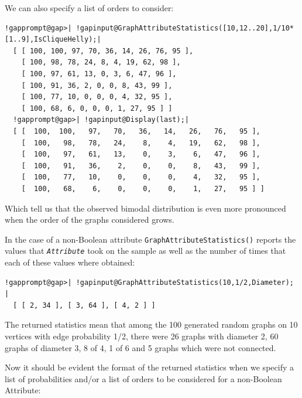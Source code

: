 \documentclass[a4paper,11pt]{report}
\begin{document}
{{{We can also specify a list of orders to consider: 

 
\begin{Verbatim}[commandchars=!@|,fontsize=\small,frame=single,label=Example]
  !gapprompt@gap>| !gapinput@GraphAttributeStatistics([10,12..20],1/10*[1..9],IsCliqueHelly);|
  [ [ 100, 100, 97, 70, 36, 14, 26, 76, 95 ], 
    [ 100, 98, 78, 24, 8, 4, 19, 62, 98 ], 
    [ 100, 97, 61, 13, 0, 3, 6, 47, 96 ], 
    [ 100, 91, 36, 2, 0, 0, 8, 43, 99 ], 
    [ 100, 77, 10, 0, 0, 0, 4, 32, 95 ], 
    [ 100, 68, 6, 0, 0, 0, 1, 27, 95 ] ]
  !gapprompt@gap>| !gapinput@Display(last);|
  [ [  100,  100,   97,   70,   36,   14,   26,   76,   95 ],
    [  100,   98,   78,   24,    8,    4,   19,   62,   98 ],
    [  100,   97,   61,   13,    0,    3,    6,   47,   96 ],
    [  100,   91,   36,    2,    0,    0,    8,   43,   99 ],
    [  100,   77,   10,    0,    0,    0,    4,   32,   95 ],
    [  100,   68,    6,    0,    0,    0,    1,   27,   95 ] ]
\end{Verbatim}
 

Which tell us that the observed bimodal distribution is even more pronounced
when the order of the graphs considered grows. 

In the case of a non-Boolean attribute \texttt{GraphAttributeStatistics()} reports the values that \mbox{\texttt{\mdseries\slshape Attribute}} took on the sample as well as the number of times that each of these values
where obtained: 

 
\begin{Verbatim}[commandchars=!@|,fontsize=\small,frame=single,label=Example]
  !gapprompt@gap>| !gapinput@GraphAttributeStatistics(10,1/2,Diameter);     |
  [ [ 2, 34 ], [ 3, 64 ], [ 4, 2 ] ]
\end{Verbatim}
 

The returned statistics mean that among the 100 generated random graphs on 10
vertices with edge probability 1/2, there were 26 graphs with diameter 2, 60
graphs of diameter 3, 8 of 4, 1 of 6 and 5 graphs which were not connected. 

Now it should be evident the format of the returned statistics when we specify
a list of probabilities and/or a list of orders to be considered for a
non-Boolean Attribute: 

}}}
\end{document}
